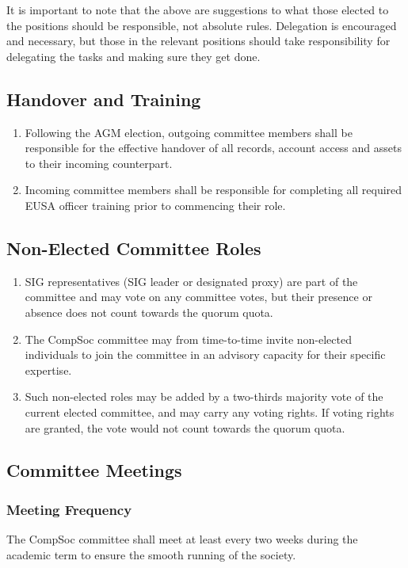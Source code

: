 It is important to note that the above are suggestions to what those elected to the positions should be responsible, not absolute rules. Delegation is encouraged and necessary, but those in the relevant positions should take responsibility for delegating the tasks and making sure they get done. 

\subsection{Handover and Training}
\begin{enumerate}
    \item Following the AGM election, outgoing committee members shall be responsible for the effective handover of all records, account access and assets to their incoming counterpart.
    \item Incoming committee members shall be responsible for completing all required EUSA officer training prior to commencing their role.  
\end{enumerate}

\subsection{Non-Elected Committee Roles}
\begin{enumerate}
    \item SIG representatives (SIG leader or designated proxy) are part of the committee and may vote on any committee votes, but their presence or absence does not count towards the quorum quota.
    \item The CompSoc committee may from time-to-time invite non-elected individuals to join the committee in an advisory capacity for their specific expertise.
    \item Such non-elected roles may be added by a two-thirds majority vote of the current elected committee, and may carry any voting rights. If voting rights are granted, the vote would not count towards the quorum quota.
\end{enumerate}
\vfill

\subsection{Committee Meetings}

\subsubsection{Meeting Frequency}
The CompSoc committee shall meet at least every two weeks during the academic term to ensure the smooth running of the society.

